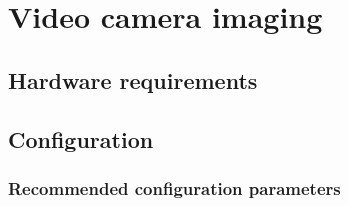 \chapter{Video camera imaging}

\section{Hardware requirements}

\section{Configuration}

\subsection{Recommended configuration parameters}